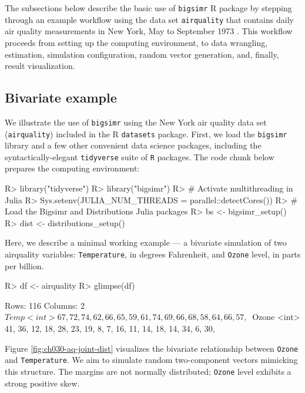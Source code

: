 \documentclass[
]{jss}
\begin{document}
The subsections below describe the basic use of \texttt{bigsimr} R package by stepping through an example workflow using the data set \texttt{airquality} that contains daily air quality measurements in New York, May to September 1973 \citep{Chambers1983}. This workflow proceeds from setting up the computing environment, to data wrangling, estimation, simulation configuration, random vector generation, and, finally, result visualization.

\hypertarget{bivariate-example}{%
\subsection{Bivariate example}\label{bivariate-example}}

We illustrate the use of \texttt{bigsimr} using the New York air quality data set (\texttt{airquality}) included in the R \texttt{datasets} package. First, we load the \texttt{bigsimr} library and a few other convenient data science packages, including the syntactically-elegant \texttt{tidyverse} suite of \texttt{R} packages. The code chunk below prepares the computing environment:

\begin{CodeChunk}
\begin{CodeInput}
R> library("tidyverse")
R> library("bigsimr")
R> # Activate multithreading in Julia
R> Sys.setenv(JULIA_NUM_THREADS = parallel::detectCores())
R> # Load the Bigsimr and Distributions Julia packages
R> bs <- bigsimr_setup()
R> dist <- distributions_setup()
\end{CodeInput}
\end{CodeChunk}

Here, we describe a minimal working example --- a bivariate simulation of two airquality variables: \texttt{Temperature}, in degrees Fahrenheit, and \texttt{Ozone} level, in parts per billion.

\begin{CodeChunk}
\begin{CodeInput}
R> df <- airquality %
R> glimpse(df)
\end{CodeInput}
\begin{CodeOutput}
Rows: 116
Columns: 2
$ Temp  <int> 67, 72, 74, 62, 66, 65, 59, 61, 74, 69, 66, 68, 58, 64, 66, 57, ~
$ Ozone <int> 41, 36, 12, 18, 28, 23, 19, 8, 7, 16, 11, 14, 18, 14, 34, 6, 30,~
\end{CodeOutput}
\end{CodeChunk}

Figure \ref{fig:ch030-aq-joint-dist} visualizes the bivariate relationship between \texttt{Ozone} and \texttt{Temperature}. We aim to simulate random two-component vectors mimicking this structure. The margins are not normally distributed; \texttt{Ozone} level exhibits a strong positive skew.
\end{document}
